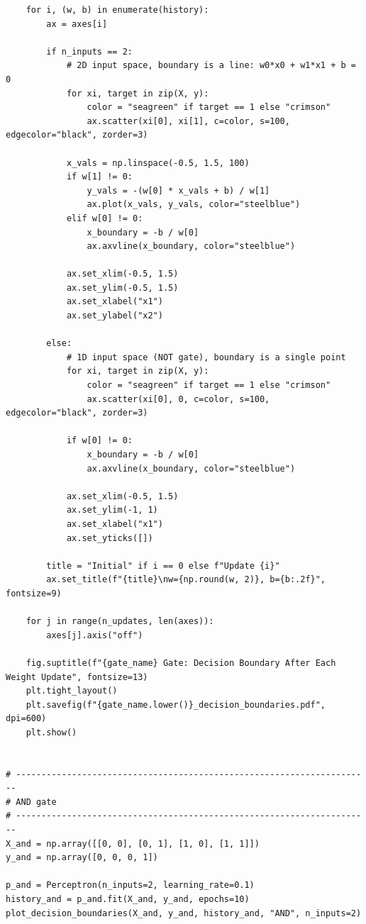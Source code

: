 \begin{verbatim}
    for i, (w, b) in enumerate(history):
        ax = axes[i]

        if n_inputs == 2:
            # 2D input space, boundary is a line: w0*x0 + w1*x1 + b = 0
            for xi, target in zip(X, y):
                color = "seagreen" if target == 1 else "crimson"
                ax.scatter(xi[0], xi[1], c=color, s=100, edgecolor="black", zorder=3)

            x_vals = np.linspace(-0.5, 1.5, 100)
            if w[1] != 0:
                y_vals = -(w[0] * x_vals + b) / w[1]
                ax.plot(x_vals, y_vals, color="steelblue")
            elif w[0] != 0:
                x_boundary = -b / w[0]
                ax.axvline(x_boundary, color="steelblue")

            ax.set_xlim(-0.5, 1.5)
            ax.set_ylim(-0.5, 1.5)
            ax.set_xlabel("x1")
            ax.set_ylabel("x2")

        else:
            # 1D input space (NOT gate), boundary is a single point
            for xi, target in zip(X, y):
                color = "seagreen" if target == 1 else "crimson"
                ax.scatter(xi[0], 0, c=color, s=100, edgecolor="black", zorder=3)

            if w[0] != 0:
                x_boundary = -b / w[0]
                ax.axvline(x_boundary, color="steelblue")

            ax.set_xlim(-0.5, 1.5)
            ax.set_ylim(-1, 1)
            ax.set_xlabel("x1")
            ax.set_yticks([])

        title = "Initial" if i == 0 else f"Update {i}"
        ax.set_title(f"{title}\nw={np.round(w, 2)}, b={b:.2f}", fontsize=9)

    for j in range(n_updates, len(axes)):
        axes[j].axis("off")

    fig.suptitle(f"{gate_name} Gate: Decision Boundary After Each Weight Update", fontsize=13)
    plt.tight_layout()
    plt.savefig(f"{gate_name.lower()}_decision_boundaries.pdf", dpi=600)
    plt.show()


# ----------------------------------------------------------------------
# AND gate
# ----------------------------------------------------------------------
X_and = np.array([[0, 0], [0, 1], [1, 0], [1, 1]])
y_and = np.array([0, 0, 0, 1])

p_and = Perceptron(n_inputs=2, learning_rate=0.1)
history_and = p_and.fit(X_and, y_and, epochs=10)
plot_decision_boundaries(X_and, y_and, history_and, "AND", n_inputs=2)



\end{verbatim}
